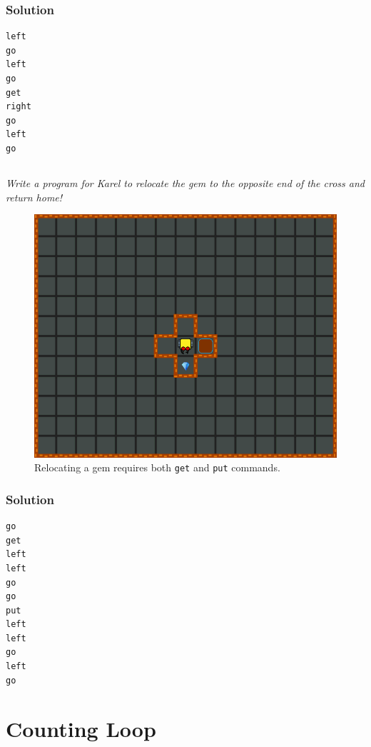 \documentclass[article,A4,12pt]{llncs}
\begin{document}
{{\subsubsection{Solution}
\begin{verbatim}
left
go
left
go
get
right
go
left
go
\end{verbatim}

\newpage
\subsection{}

{\em Write a program for Karel to relocate the gem to the opposite 
end of the cross and return home!}



\begin{figure}[!ht]
\begin{center}
\includegraphics[height=0.4\textwidth]{imgk/b04.png}
\end{center}
\vspace{-4mm}
\caption{Relocating a gem requires both {\tt get} and {\tt put} commands.}
\label{fig:b04}
\vspace{-4mm}
\end{figure}
\noindent

\subsubsection{Solution}
\begin{verbatim}
go
get
left
left
go
go
put
left
left
go
left 
go
\end{verbatim}



\newpage
\setcounter{section}{5}
\section{Counting Loop}

\subsection{}

}}
\end{document}
